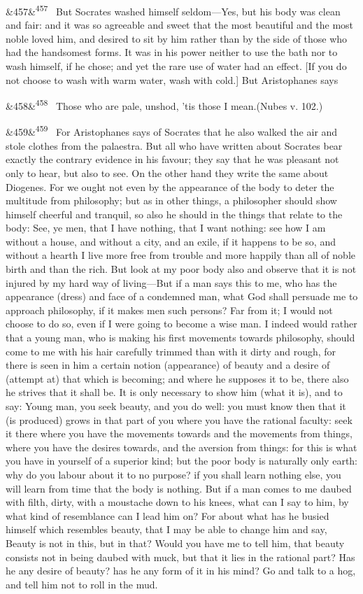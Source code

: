 \documentclass[12pt]{article}
\newcommand{\para}[1][]{\par\noindent\ifx&#1&\else\textsuperscript{\footnotesize #1}~\fi}
\begin{document}
\para[457] But Socrates washed himself seldom—Yes, but his body was clean and fair: and it was so agreeable and sweet that the most beautiful and the most noble loved him, and desired to sit by him rather than by the side of those who had the handsomest forms. It was in his power neither to use the bath nor to wash himself, if he chose; and yet the rare use of water had an effect. [If you do not choose to wash with warm water, wash with cold.] But Aristophanes says

\para[458] Those who are pale, unshod, 'tis those I mean.(Nubes v. 102.)

\para[459] For Aristophanes says of Socrates that he also walked the air and stole clothes from the palaestra. But all who have written about Socrates bear exactly the contrary evidence in his favour; they say that he was pleasant not only to hear, but also to see. On the other hand they write the same about Diogenes. For we ought not even by the appearance of the body to deter the multitude from philosophy; but as in other things, a philosopher should show himself cheerful and tranquil, so also he should in the things that relate to the body: See, ye men, that I have nothing, that I want nothing: see how I am without a house, and without a city, and an exile, if it happens to be so, and without a hearth I live more free from trouble and more happily than all of noble birth and than the rich. But look at my poor body also and observe that it is not injured by my hard way of living—But if a man says this to me, who has the appearance (dress) and face of a condemned man, what God shall persuade me to approach philosophy, if it makes men such persons? Far from it; I would not choose to do so, even if I were going to become a wise man. I indeed would rather that a young man, who is making his first movements towards philosophy, should come to me with his hair carefully trimmed than with it dirty and rough, for there is seen in him a certain notion (appearance) of beauty and a desire of (attempt at) that which is becoming; and where he supposes it to be, there also he strives that it shall be. It is only necessary to show him (what it is), and to say: Young man, you seek beauty, and you do well: you must know then that it (is produced) grows in that part of you where you have the rational faculty: seek it there where you have the movements towards and the movements from things, where you have the desires towards, and the aversion from things: for this is what you have in yourself of a superior kind; but the poor body is naturally only earth: why do you labour about it to no purpose? if you shall learn nothing else, you will learn from time that the body is nothing. But if a man comes to me daubed with filth, dirty, with a moustache down to his knees, what can I say to him, by what kind of resemblance can I lead him on? For about what has he busied himself which resembles beauty, that I may be able to change him and say, Beauty is not in this, but in that? Would you have me to tell him, that beauty consists not in being daubed with muck, but that it lies in the rational part? Has he any desire of beauty? has he any form of it in his mind? Go and talk to a hog, and tell him not to roll in the mud.
\end{document}
